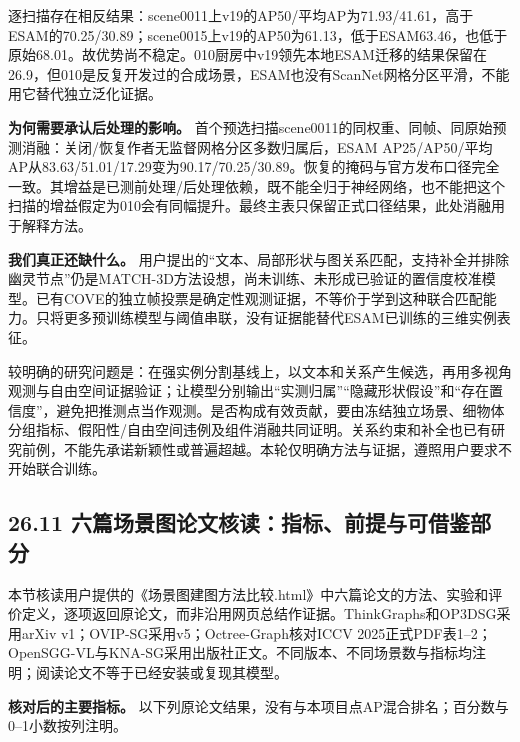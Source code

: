 \documentclass[UTF8,fontset=fandol]{ctexart}
\begin{document}
逐扫描存在相反结果：scene0011上v19的AP50/平均AP为71.93/41.61，高于ESAM的70.25/30.89；scene0015上v19的AP50为61.13，低于ESAM63.46，也低于原始68.01。故优势尚不稳定。010厨房中v19领先本地ESAM迁移的结果保留在26.9，但010是反复开发过的合成场景，ESAM也没有ScanNet网格分区平滑，不能用它替代独立泛化证据。



\textbf{为何需要承认后处理的影响。} 首个预选扫描scene0011的同权重、同帧、同原始预测消融：关闭/恢复作者无监督网格分区多数归属后，ESAM AP25/AP50/平均AP从83.63/51.01/17.29变为90.17/70.25/30.89。恢复的掩码与官方发布口径完全一致。其增益是已测前处理/后处理依赖，既不能全归于神经网络，也不能把这个扫描的增益假定为010会有同幅提升。最终主表只保留正式口径结果，此处消融用于解释方法。



\textbf{我们真正还缺什么。} 用户提出的“文本、局部形状与图关系匹配，支持补全并排除幽灵节点”仍是MATCH-3D方法设想，尚未训练、未形成已验证的置信度校准模型。已有COVE的独立帧投票是确定性观测证据，不等价于学到这种联合匹配能力。只将更多预训练模型与阈值串联，没有证据能替代ESAM已训练的三维实例表征。



较明确的研究问题是：在强实例分割基线上，以文本和关系产生候选，再用多视角观测与自由空间证据验证；让模型分别输出“实测归属”“隐藏形状假设”和“存在置信度”，避免把推测点当作观测。是否构成有效贡献，要由冻结独立场景、细物体分组指标、假阳性/自由空间违例及组件消融共同证明。关系约束和补全也已有研究前例，不能先承诺新颖性或普遍超越。本轮仅明确方法与证据，遵照用户要求不开始联合训练。



\subsection*{26.11 六篇场景图论文核读：指标、前提与可借鉴部分}

本节核读用户提供的《场景图建图方法比较.html》中六篇论文的方法、实验和评价定义，逐项返回原论文，而非沿用网页总结作证据。ThinkGraphs和OP3DSG采用arXiv v1；OVIP-SG采用v5；Octree-Graph核对ICCV 2025正式PDF表1–2；OpenSGG-VL与KNA-SG采用出版社正文。不同版本、不同场景数与指标均注明；阅读论文不等于已经安装或复现其模型。



\textbf{核对后的主要指标。} 以下列原论文结果，没有与本项目点AP混合排名；百分数与0–1小数按列注明。
\end{document}

